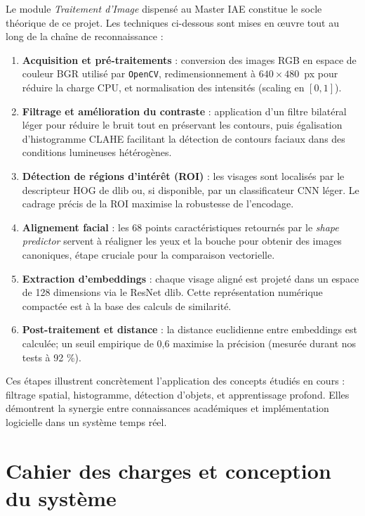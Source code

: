 \documentclass[12pt,a4paper]{article}
\begin{document}
Le module \textit{Traitement d'Image} dispensé au Master IAE constitue le socle théorique de ce projet. Les techniques ci-dessous sont mises en \oe{}uvre tout au long de la chaîne de reconnaissance :
\begin{enumerate}[label=\alph*)]
  \item \textbf{Acquisition et pré-traitements} : conversion des images RGB en espace de couleur BGR utilisé par \texttt{OpenCV}, redimensionnement à \(640\times480\)~px pour réduire la charge CPU, et normalisation des intensités (scaling en \([0,1]\)).
  \item \textbf{Filtrage et amélioration du contraste} : application d'un filtre bilatéral léger pour réduire le bruit tout en préservant les contours, puis égalisation d'histogramme CLAHE facilitant la détection de contours faciaux dans des conditions lumineuses hétérogènes.
  \item \textbf{Détection de régions d'intérêt (ROI)} : les visages sont localisés par le descripteur HOG de dlib ou, si disponible, par un classificateur CNN léger. Le cadrage précis de la ROI maximise la robustesse de l'encodage.
  \item \textbf{Alignement facial} : les 68 points caractéristiques retournés par le \textit{shape predictor} servent à réaligner les yeux et la bouche pour obtenir des images canoniques, étape cruciale pour la comparaison vectorielle.
  \item \textbf{Extraction d'embeddings} : chaque visage aligné est projeté dans un espace de 128 dimensions via le ResNet dlib. Cette représentation numérique compactée est à la base des calculs de similarité.
  \item \textbf{Post-traitement et distance} : la distance euclidienne entre embeddings est calculée; un seuil empirique de 0,6 maximise la précision (mesurée durant nos tests à 92 \%).
\end{enumerate}

Ces étapes illustrent concrètement l'application des concepts étudiés en cours : filtrage spatial, histogramme, détection d'objets, et apprentissage profond. Elles démontrent la synergie entre connaissances académiques et implémentation logicielle dans un système temps réel.

\newpage

\section{Cahier des charges et conception du système}
\end{document}
